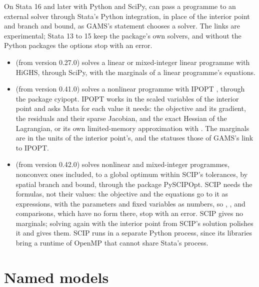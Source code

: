 On Stata 16 and later with Python and SciPy,  can pass a
programme to an external solver through Stata's Python integration, in place
of the interior point and branch and bound, as GAMS's  statement
chooses a solver. The links are experimental; Stata 13 to 15 keep the
package's own solvers, and without the Python packages the options stop
with an error.
\begin{itemize}
\item {} (from version 0.27.0) solves a linear or
mixed-integer linear programme with HiGHS, through SciPy, with the marginals
of a linear programme's equations.
\item {} (from version 0.41.0) solves a nonlinear programme
with IPOPT \citep{wachter2006}, through the package cyipopt. IPOPT works in
the scaled variables of the interior point and asks Mata for each value it
needs: the objective and its gradient, the residuals and their sparse
Jacobian, and the exact Hessian of the Lagrangian, or its own limited-memory
approximation with . The marginals
are in the units of the interior point's, and the statuses those of GAMS's
link to IPOPT.
\item {} (from version 0.42.0) solves nonlinear and
mixed-integer programmes, nonconvex ones included, to a global optimum
within SCIP's tolerances, by spatial branch and bound, through the package
PySCIPOpt. SCIP needs the formulas, not their values: the objective and the
equations go to it as expressions, with the parameters and fixed variables
as numbers, so , ,  and comparisons,
which have no form there, stop with an error. SCIP gives no marginals;
solving again with the interior point from SCIP's solution polishes it and
gives them. SCIP runs in a separate Python process, since its libraries bring
a runtime of OpenMP that cannot share Stata's process.
\end{itemize}

\section{Named models}\label{sec:namedmodels}

